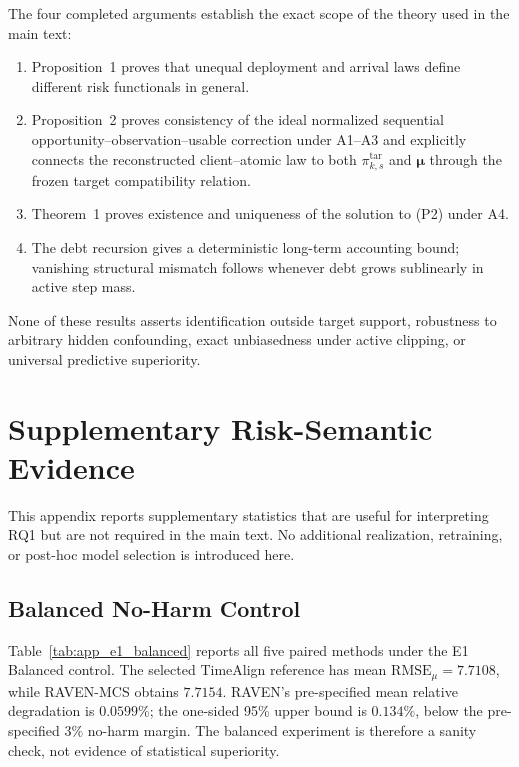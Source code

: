 \documentclass[letterpaper,journal]{IEEEtran}
\begin{document}
The four completed arguments establish the exact scope of the theory used in
the main text:

\begin{enumerate}
    \item Proposition~1 proves that unequal deployment and arrival laws define
    different risk functionals in general.
    \item Proposition~2 proves consistency of the ideal normalized sequential
    opportunity--observation--usable correction under A1--A3 and explicitly
    connects the reconstructed client--atomic law to both
    $\pi^{\mathrm{tar}}_{k,s}$ and $\boldsymbol\mu$ through the frozen target
    compatibility relation.
    \item Theorem~1 proves existence and uniqueness of the solution to (P2)
    under A4.
    \item The debt recursion gives a deterministic long-term accounting bound;
    vanishing structural mismatch follows whenever debt grows sublinearly in
    active step mass.
\end{enumerate}

None of these results asserts identification outside target support, robustness
to arbitrary hidden confounding, exact unbiasedness under active clipping, or
universal predictive superiority.




\section{Supplementary Risk-Semantic Evidence}
\label{app:risk_semantic_evidence}

This appendix reports supplementary statistics that are useful for interpreting
RQ1 but are not required in the main text.  No additional realization,
retraining, or post-hoc model selection is introduced here.

\subsection{Balanced No-Harm Control}
\label{app:e1_balanced}

Table~\ref{tab:app_e1_balanced} reports all five paired methods under the E1
Balanced control.  The selected TimeAlign reference has mean
$\mathrm{RMSE}_\mu=7.7108$, while RAVEN-MCS obtains $7.7154$.  RAVEN's
pre-specified mean relative degradation is $0.0599\%$; the one-sided 95\%
upper bound is $0.134\%$, below the pre-specified $3\%$ no-harm margin.  The
balanced experiment is therefore a sanity check, not evidence of statistical
superiority.
\end{document}
